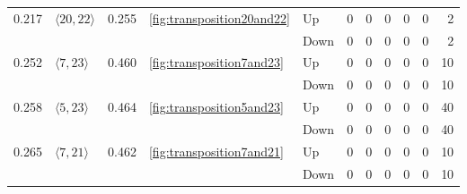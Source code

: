 \documentclass{article}
\begin{document}
\begin{center}
\begin{tabular}{lllllrrrrrr}
\cline{1-11} \cline{2-11} \cline{3-11} \cline{4-11}
\multirow[t]{2}{*}{0.217} & \multirow[t]{2}{*}{$\langle20, 22\rangle$} & \multirow[t]{2}{*}{0.255} & \multirow[t]{2}{*}{\ref{fig:transposition20and22}} & Up & 0 & 0 & 0 & 0 & 0 & 2 \\
 &  &  &  & Down & 0 & 0 & 0 & 0 & 0 & 2 \\
\cline{1-11} \cline{2-11} \cline{3-11} \cline{4-11}
\multirow[t]{2}{*}{0.252} & \multirow[t]{2}{*}{$\langle7, 23\rangle$} & \multirow[t]{2}{*}{0.460} & \multirow[t]{2}{*}{\ref{fig:transposition7and23}} & Up & 0 & 0 & 0 & 0 & 0 & 10 \\
 &  &  &  & Down & 0 & 0 & 0 & 0 & 0 & 10 \\
\cline{1-11} \cline{2-11} \cline{3-11} \cline{4-11}
\multirow[t]{2}{*}{0.258} & \multirow[t]{2}{*}{$\langle5, 23\rangle$} & \multirow[t]{2}{*}{0.464} & \multirow[t]{2}{*}{\ref{fig:transposition5and23}} & Up & 0 & 0 & 0 & 0 & 0 & 40 \\
 &  &  &  & Down & 0 & 0 & 0 & 0 & 0 & 40 \\
\cline{1-11} \cline{2-11} \cline{3-11} \cline{4-11}
\multirow[t]{2}{*}{0.265} & \multirow[t]{2}{*}{$\langle7, 21\rangle$} & \multirow[t]{2}{*}{0.462} & \multirow[t]{2}{*}{\ref{fig:transposition7and21}} & Up & 0 & 0 & 0 & 0 & 0 & 10 \\
 &  &  &  & Down & 0 & 0 & 0 & 0 & 0 & 10 \\
\cline{1-11} \cline{2-11} \cline{3-11} \cline{4-11}
\bottomrule
\end{tabular}


\end{center}
\end{document}

